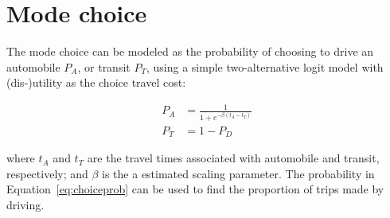 \documentclass{article}
\begin{document}
\section{Mode choice}

The mode choice can be modeled as the probability of choosing to drive an automobile $P_A$, or transit $P_T$, using a simple two-alternative logit model with (dis-)utility as the choice travel cost:

\begin{subequations}
    \label{eq:choiceprob}
    \begin{align}
        P_A & = \frac{1}{1+e^{-\beta (t_A-t_T)}}\\
        P_T & = 1 - P_D
    \end{align}
\end{subequations}

\noindent where $t_A$ and $t_T$ are the travel times associated with automobile and transit, respectively; and $\beta$ is the a estimated scaling parameter. The probability in Equation~\eqref{eq:choiceprob} can be used to find the proportion of trips made by driving.
\end{document}
